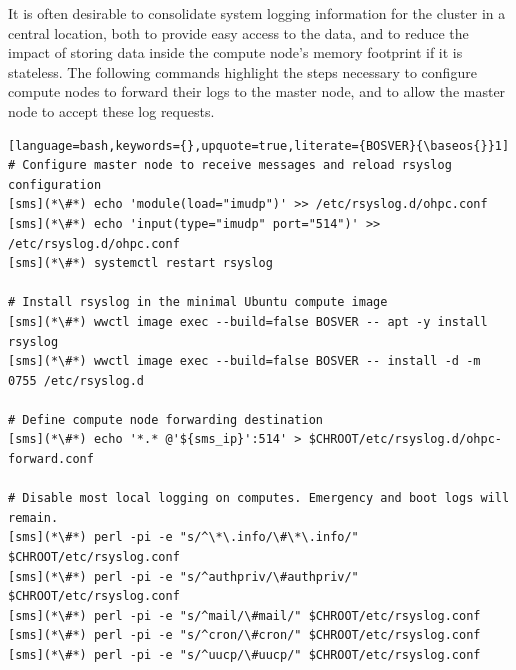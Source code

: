 It is often desirable to consolidate system logging information for the cluster
in a central location, both to provide easy access to the data, and to reduce
the impact of storing data inside the compute node's memory footprint if it is
stateless. The following commands highlight the steps necessary to configure
compute nodes to forward their logs to the master node, and to allow the master
node to accept these log requests.

\begin{lstlisting}[language=bash,keywords={},upquote=true,literate={BOSVER}{\baseos{}}1]
# Configure master node to receive messages and reload rsyslog configuration
[sms](*\#*) echo 'module(load="imudp")' >> /etc/rsyslog.d/ohpc.conf
[sms](*\#*) echo 'input(type="imudp" port="514")' >> /etc/rsyslog.d/ohpc.conf
[sms](*\#*) systemctl restart rsyslog

# Install rsyslog in the minimal Ubuntu compute image
[sms](*\#*) wwctl image exec --build=false BOSVER -- apt -y install rsyslog
[sms](*\#*) wwctl image exec --build=false BOSVER -- install -d -m 0755 /etc/rsyslog.d

# Define compute node forwarding destination
[sms](*\#*) echo '*.* @'${sms_ip}':514' > $CHROOT/etc/rsyslog.d/ohpc-forward.conf

# Disable most local logging on computes. Emergency and boot logs will remain.
[sms](*\#*) perl -pi -e "s/^\*\.info/\#\*\.info/" $CHROOT/etc/rsyslog.conf
[sms](*\#*) perl -pi -e "s/^authpriv/\#authpriv/" $CHROOT/etc/rsyslog.conf
[sms](*\#*) perl -pi -e "s/^mail/\#mail/" $CHROOT/etc/rsyslog.conf
[sms](*\#*) perl -pi -e "s/^cron/\#cron/" $CHROOT/etc/rsyslog.conf
[sms](*\#*) perl -pi -e "s/^uucp/\#uucp/" $CHROOT/etc/rsyslog.conf
\end{lstlisting}
